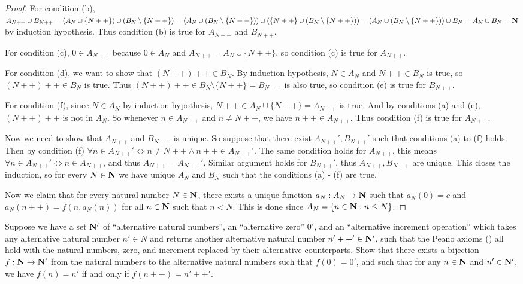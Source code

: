 \begin{proof}
  For condition (b), \(A_{N++} \cup B_{N++} = (A_N \cup \{N++\}) \cup (B_N \setminus \{N++\}) = (A_N \cup (B_N \setminus \{N++\})) \cup (\{N++\} \cup (B_N \setminus \{N++\})) = (A_N \cup (B_N \setminus \{N++\})) \cup B_N = A_N \cup B_N = \mathbf{N}\) by induction hypothesis.
  Thus condition (b) is true for \(A_{N++}\) and \(B_{N++}\).

  For condition (c), \(0 \in A_{N++}\) because \(0 \in A_N\) and \(A_{N++} = A_N \cup \{N++\}\), so condition (c) is true for \(A_{N++}\).

  For condition (d), we want to show that \((N++)++ \in B_N\).
  By induction hypothesis, \(N \in A_N\) and \(N++ \in B_N\) is true, so \((N++)++ \in B_N\) is true.
  Thus \((N++)++ \in B_N \setminus \{N++\} = B_{N++}\) is also true, so condition (e) is true for \(B_{N++}\).

  For condition (f), since \(N \in A_N\) by induction hypothesis, \(N++ \in A_N \cup \{N++\} = A_{N++}\) is true.
  And by conditions (a) and (e), \((N++)++\) is not in \(A_N\).
  So whenever \(n \in A_{N++}\) and \(n \neq N++\), we have \(n++ \in A_{N++}\).
  Thus condition (f) is true for \(A_{N++}\).

  Now we need to show that \(A_{N++}\) and \(B_{N++}\) is unique.
  So suppose that there exist \(A_{N++}', B_{N++}'\) such that conditions (a) to (f) holds.
  Then by condition (f) \(\forall n \in A_{N++}' \iff n \neq N++ \land n++ \in A_{N++}'\).
  The same condition holds for \(A_{N++}\), this means \(\forall n \in A_{N++}' \iff n \in A_{N++}\), and thus \(A_{N++} = A_{N++}'\).
  Similar argument holds for \(B_{N++}'\), thus \(A_{N++}, B_{N++}\) are unique.
  This closes the induction, so for every \(N \in \mathbf{N}\) we have unique \(A_N\) and \(B_N\) such that the conditions (a) - (f) are true.

  Now we claim that for every natural number \(N \in \mathbf{N}\), there exists a unique function \(a_N : A_N \to \mathbf{N}\) such that \(a_N(0) = c\) and \(a_N(n++) = f(n, a_{N}(n))\) for all \(n \in \mathbf{N}\) such that \(n < N\).
  This is done since \(A_N = \{n \in \mathbf{N} : n \leq N\}\).
\end{proof}

\begin{exercise}\label{ex 3.5.13}
  Suppose we have a set \(\mathbf{N}'\) of ``alternative natural numbers'', an ``alternative zero'' \(0'\), and an ``alternative increment operation'' which takes any alternative natural number \(n' \in N\) and returns another alternative natural number \(n'++' \in \mathbf{N}'\), such that the Peano axioms () all hold with the natural numbers, zero, and increment replaced by their alternative counterparts.
  Show that there exists a bijection \(f : \mathbf{N} \to \mathbf{N}'\) from the natural numbers to the alternative natural numbers such that \(f(0) = 0'\), and such that for any \(n \in \mathbf{N}\) and \(n' \in \mathbf{N}'\), we have \(f(n) = n'\) if and only if \(f(n++) = n'++'\).
\end{exercise}

